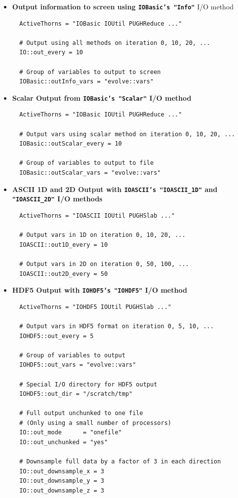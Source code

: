 \documentclass{article}
\begin{document}
\begin{itemize}
\item{\bf Output information to screen using {\tt IOBasic's "Info"}} I/O method
\begin{verbatim}
  ActiveThorns = "IOBasic IOUtil PUGHReduce ..."

  # Output using all methods on iteration 0, 10, 20, ...
  IO::out_every = 10

  # Group of variables to output to screen
  IOBasic::outInfo_vars = "evolve::vars"
\end{verbatim}

\item{\bf Scalar Output from {\tt IOBasic's "Scalar"} I/O method}
\begin{verbatim}
  ActiveThorns = "IOBasic IOUtil PUGHReduce ..."

  # Output vars using scalar method on iteration 0, 10, 20, ...
  IOBasic::outScalar_every = 10

  # Group of variables to output to file
  IOBasic::outScalar_vars = "evolve::vars"
\end{verbatim}

\item{\bf ASCII 1D and 2D Output with {\tt IOASCII's "IOASCII\_1D"} and
{\tt "IOASCII\_2D"} I/O methods}
\begin{verbatim}
  ActiveThorns = "IOASCII IOUtil PUGHSlab ..."

  # Output vars in 1D on iteration 0, 10, 20, ...
  IOASCII::out1D_every = 10

  # Output vars in 2D on iteration 0, 50, 100, ...
  IOASCII::out2D_every = 50
\end{verbatim}

\item{\bf HDF5 Output with {\tt IOHDF5's "IOHDF5"} I/O method}
\begin{verbatim}
  ActiveThorns = "IOHDF5 IOUtil PUGHSlab ..."

  # Output vars in HDF5 format on iteration 0, 5, 10, ...
  IOHDF5::out_every = 5

  # Group of variables to output
  IOHDF5::out_vars = "evolve::vars"

  # Special I/O directory for HDF5 output
  IOHDF5::out_dir = "/scratch/tmp"

  # Full output unchunked to one file
  # (Only using a small number of processors)
  IO::out_mode      = "onefile"
  IO::out_unchunked = "yes"

  # Downsample full data by a factor of 3 in each direction
  IO::out_downsample_x = 3
  IO::out_downsample_y = 3
  IO::out_downsample_z = 3
\end{verbatim}


\end{itemize}
\end{document}
